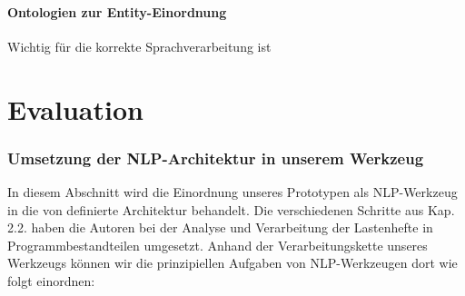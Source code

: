 \documentclass[12pt]{report}
\begin{document}
\subsubsection{Ontologien zur Entity-Einordnung}
Wichtig für die korrekte Sprachverarbeitung ist 

\chapter{Evaluation}
\subsection{Umsetzung der NLP-Architektur in unserem Werkzeug}
In diesem Abschnitt wird die Einordnung unseres Prototypen als NLP-Werkzeug in die von \cite{cop04} definierte Architektur behandelt. Die verschiedenen Schritte aus Kap. 2.2. haben die Autoren bei der Analyse und Verarbeitung der Lastenhefte in Programmbestandteilen umgesetzt. Anhand der Verarbeitungskette unseres Werkzeugs können wir die prinzipiellen Aufgaben von NLP-Werkzeugen dort wie folgt einordnen:
\end{document}
